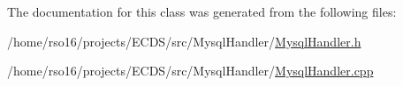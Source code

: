The documentation for this class was generated from the following files\+:\begin{DoxyCompactItemize}
\item 
/home/rso16/projects/\+E\+C\+D\+S/src/\+Mysql\+Handler/\hyperlink{MysqlHandler_8h}{Mysql\+Handler.\+h}\item 
/home/rso16/projects/\+E\+C\+D\+S/src/\+Mysql\+Handler/\hyperlink{MysqlHandler_8cpp}{Mysql\+Handler.\+cpp}\end{DoxyCompactItemize}
